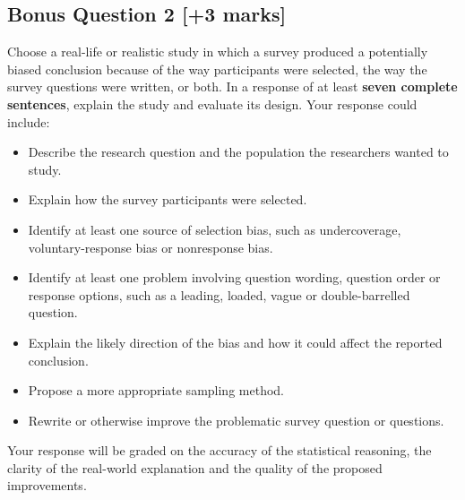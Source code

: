 \documentclass[10pt,letterpaper]{article}
\begin{document}
\subsection*{Bonus Question 2 \hfill [+3 marks]}
Choose a real-life or realistic study in which a survey produced a potentially biased conclusion because of the way participants were selected, the way the survey questions were written, or both. In a response of at least \textbf{seven complete sentences}, explain the study and evaluate its design. Your response could include:
\begin{itemize}
	\item Describe the research question and the population the researchers wanted to study.
	\item Explain how the survey participants were selected.
	\item Identify at least one source of selection bias, such as undercoverage, voluntary-response bias or nonresponse bias.
	\item Identify at least one problem involving question wording, question order or response options, such as a leading, loaded, vague or double-barrelled question.
	\item Explain the likely direction of the bias and how it could affect the reported conclusion.
	\item Propose a more appropriate sampling method.
	\item Rewrite or otherwise improve the problematic survey question or questions.
\end{itemize}
Your response will be graded on the accuracy of the statistical reasoning, the clarity of the real-world explanation and the quality of the proposed improvements.
\end{document}
